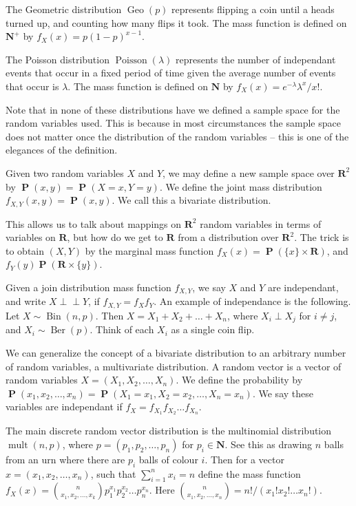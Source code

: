 \documentclass{report}
\DeclareMathOperator{\prob}{\mathbf{P}}
\DeclareMathOperator{\Ber}{Ber}
\DeclareMathOperator{\Bin}{Bin}
\DeclareMathOperator{\Geo}{Geo}
\DeclareMathOperator{\Poisson}{Poisson}
\DeclareMathOperator{\multi}{mult}
\begin{document}
The Geometric distribution $\Geo(p)$ represents flipping a coin until a heads turned up, and counting how many flips it took. The mass function is defined on $\mathbf{N}^+$ by $f_X(x) = p(1-p)^{x-1}$.

The Poisson distribution $\Poisson(\lambda)$ represents the number of independant events that occur in a fixed period of time given the average number of events that occur is $\lambda$. The mass function is defined on $\mathbf{N}$ by $f_X(x) = e^{-\lambda} \lambda^x/x!$.

Note that in none of these distributions have we defined a sample space for the random variables used. This is because in most circumstances the sample space does not matter once the distribution of the random variables -- this is one of the elegances of the definition.

Given two random variables $X$ and $Y$, we may define a new sample space over $\mathbf{R}^2$ by $\prob(x,y) = \prob(X = x, Y = y)$. We define the joint mass distribution $f_{X,Y}(x,y) = \prob(x,y)$. We call this a bivariate distribution.

This allows us to talk about mappings on $\mathbf{R}^2$ random variables in terms of variables on $\mathbf{R}$, but how do we get to $\mathbf{R}$ from a distribution over $\mathbf{R}^2$. The trick is to obtain $(X,Y)$ by the marginal mass function $f_X(x) = \prob(\{ x \} \times \mathbf{R})$, and $f_Y(y) \prob(\mathbf{R} \times \{ y \})$.

Given a join distribution mass function $f_{X,Y}$, we say $X$ and $Y$ are independant, and write $X \perp\!\!\!\!\perp Y$, if $f_{X,Y} = f_Xf_Y$. An example of independance is the following. Let $X \sim \Bin(n,p)$. Then $X = X_1 + X_2 + \dots + X_n$, where $X_i \perp\!\!\!\! X_j$ for $i \neq j$, and $X_i \sim \Ber(p)$. Think of each $X_i$ as a single coin flip.

We can generalize the concept of a bivariate distribution to an arbitrary number of random variables, a multivariate distribution. A random vector is a vector of random variables $X = (X_1, X_2, \dots, X_n)$. We define the probability by $\prob(x_1, x_2, \dots, x_n) = \prob(X_1 = x_1, X_2 = x_2, \dots, X_n = x_n)$. We say these variables are independant if $f_X = f_{X_1}f_{X_2}\dots f_{X_n}$.

The main discrete random vector distribution is the multinomial distribution $\multi(n,p)$, where $p = (p_1, p_2, \dots, p_n)$ for $p_i \in \mathbf{N}$. See this as drawing $n$ balls from an urn where there are $p_i$ balls of colour $i$. Then for a vector $x = (x_1, x_2, \dots, x_n)$, such that $\sum_{i = 1}^n x_i = n$ define the mass function $f_X(x) = {n \choose x_1,x_2,\dots,x_k}p_1^{x_1}p_2^{x_2} \dots p_n^{x_n}$. Here ${n \choose x_1,x_2,\dots,x_n} = n!/(x_1! x_2! \dots x_n!)$.
\end{document}
